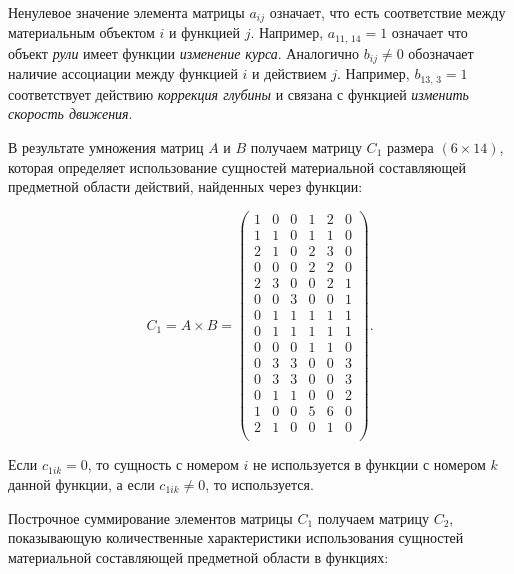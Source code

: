 Ненулевое значение элемента матрицы $a_{ij}$ означает, что есть соответствие между материальным объектом $i$ и функцией $j$.
Например, $a_{11,\,14} = 1$ означает что объект \textit{рули} имеет функции \textit{изменение курса}.
Аналогично $b_{ij} \ne 0$ обозначает наличие ассоциации между функцией $i$ и действием $j$.
Например, $b_{13,\,3} = 1$ соответствует действию \textit{коррекция глубины} и связана с функцией \textit{изменить скорость движения}.

В результате умножения матриц $A$ и $B$ получаем матрицу $C_1$ размера $(6\times14)$,
которая определяет использование сущностей материальной составляющей предметной области действий, найденных через функции:

\begin{equation}
    C_1 = A \times B = \begin{pmatrix}
        1 & 0 & 0 & 1 & 2 & 0 \\
        1 & 1 & 0 & 1 & 1 & 0 \\
        2 & 1 & 0 & 2 & 3 & 0 \\
        0 & 0 & 0 & 2 & 2 & 0 \\
        2 & 3 & 0 & 0 & 2 & 1 \\
        0 & 0 & 3 & 0 & 0 & 1 \\
        0 & 1 & 1 & 1 & 1 & 1 \\
        0 & 1 & 1 & 1 & 1 & 1 \\
        0 & 0 & 0 & 1 & 1 & 0 \\
        0 & 3 & 3 & 0 & 0 & 3 \\
        0 & 3 & 3 & 0 & 0 & 3 \\
        0 & 1 & 1 & 0 & 0 & 2 \\
        1 & 0 & 0 & 5 & 6 & 0 \\
        2 & 1 & 0 & 0 & 1 & 0 \\
    \end{pmatrix}.
\end{equation}

Если $c_{1ik} = 0$, то сущность с номером $i$ не используется в функции с номером $k$ данной функции,
а если $c_{1ik} \ne 0$, то используется.

Построчное суммирование элементов матрицы $C_1$ получаем матрицу $C_2$, показывающую количественные характеристики
использования сущностей материальной составляющей предметной области в функциях:

